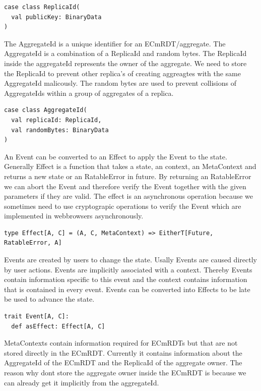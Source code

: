 \documentclass[
	ngerman,
	ruledheaders=section,   %
	class=report,		    %
	thesis={type=bachelor}, %
	accentcolor=9c,			%
	custommargins=true,    %
	marginpar=false,        %
	parskip=half-,          %
	fontsize=11pt,          %
]{tudapub}
\begin{document}
\begin{lstlisting}
case class ReplicaId(
  val publicKey: BinaryData
)
\end{lstlisting}

The AggregateId is a unique identifier for an ECmRDT/aggregate. The AggregateId is a combination of a ReplicaId and random bytes. The ReplicaId inside the aggregateId represents the owner of the aggregate. We need to store the ReplicaId to prevent other replica's of creating aggreagtes with the same AggregateId malicously. The random bytes are used to prevent collisions of AggregateIds within a group of aggregates of a replica. 

\begin{lstlisting}
case class AggregateId(
  val replicaId: ReplicaId,
  val randomBytes: BinaryData
)
\end{lstlisting}

An Event can be converted to an Effect to apply the Event to the state. Generally Effect is a function that takes a state, an context, an MetaContext and returns a new state or an RatableError in future. By returning an RatableError we can abort the Event and therefore verify the Event together with the given parameters if they are valid. The effect is an asynchronous operation because we sometimes need to use cryptograpic operations to verify the Event which are implemented in webbrowsers asynchronously.

\begin{lstlisting}
type Effect[A, C] = (A, C, MetaContext) => EitherT[Future, RatableError, A]
\end{lstlisting}

Events are created by users to change the state. Usally Events are caused directly by user actions. Events are implicitly associated with a context. Thereby Events contain information specific to this event and the context contains information that is contained in every event. Events can be converted into Effects to be late be used to advance the state.

\begin{lstlisting}
trait Event[A, C]:
  def asEffect: Effect[A, C]
\end{lstlisting}

MetaContexts contain information required for ECmRDTs but that are not stored directly in the ECmRDT. Currently it contains information about the AggregateId of the ECmRDT and the ReplicaId of the aggregate owner. The reason why dont store the aggregate owner inside the ECmRDT is because we can already get it implicitly from the aggregateId.
\end{document}
